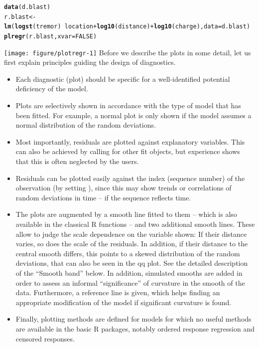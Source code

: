 \documentclass[11pt]{article}\usepackage[]{graphicx}\usepackage[]{color}
\makeatletter
\newcommand{\hlnum}[1]{\textcolor[rgb]{0.686,0.059,0.569}{#1}}%
\newcommand{\hlopt}[1]{\textcolor[rgb]{0,0,0}{#1}}%
\newcommand{\hlstd}[1]{\textcolor[rgb]{0.345,0.345,0.345}{#1}}%
\newcommand{\hlkwb}[1]{\textcolor[rgb]{0.69,0.353,0.396}{#1}}%
\newcommand{\hlkwc}[1]{\textcolor[rgb]{0.333,0.667,0.333}{#1}}%
\newcommand{\hlkwd}[1]{\textcolor[rgb]{0.737,0.353,0.396}{\textbf{#1}}}%
\newenvironment{kframe}{%
 \def\at@end@of@kframe{}%
 \ifinner\ifhmode%
  \def\at@end@of@kframe{\end{minipage}}%
  \begin{minipage}{\columnwidth}%
 \fi\fi%
 \def\FrameCommand##1{\hskip\@totalleftmargin \hskip-\fboxsep
 \colorbox{shadecolor}{##1}\hskip-\fboxsep
     \hskip-\linewidth \hskip-\@totalleftmargin \hskip\columnwidth}%
 \MakeFramed {\advance\hsize-\width
   \@totalleftmargin\z@ \linewidth\hsize
   \@setminipage}}%
 {\par\unskip\endMakeFramed%
 \at@end@of@kframe}
\newenvironment{knitrout}{}{} %
\makeatother
\begin{document}
\begin{knitrout}
\color{fgcolor}\begin{kframe}
\begin{alltt}
\hlkwd{data}\hlstd{(d.blast)}
\hlstd{r.blast} \hlkwb{<-}
  \hlkwd{lm}\hlstd{(}\hlkwd{logst}\hlstd{(tremor)}\hlopt{~}\hlstd{location}\hlopt{+}\hlkwd{log10}\hlstd{(distance)}\hlopt{+}\hlkwd{log10}\hlstd{(charge),} \hlkwc{data}\hlstd{=d.blast)}
\hlkwd{plregr}\hlstd{(r.blast,} \hlkwc{xvar}\hlstd{=}\hlnum{FALSE}\hlstd{)}
\end{alltt}
\end{kframe}
\texttt{[image: figure/plotregr-1]} 
\end{knitrout}
Before we describe the plots in some detail, let us first explain  
principles guiding the design of diagnostics.
\begin{itemize}
\item
Each diagnostic (plot) should be specific for a well-identified potential 
deficiency of the model.
\item
Plots are selectively shown in accordance with the type of model that has 
been fitted. For example, a normal plot is only shown if the model assumes
a normal distribution of the random deviations.
\item
Most importantly, residuals are plotted against explanatory variables.
This can also be achieved by calling  for other fit objects,  
but experience shows that this is often neglected by the users.
\item
Residuals can be plotted easily against the index (sequence number) 
of the observation (by setting ), 
since this may show trends or correlations of random deviations in time --
if the sequence reflects time.
\item
The plots are augmented by a smooth line fitted to them -- which is also
available in the classical R functions -- and two additional smooth lines.
These allow to judge the scale dependence on the variable shown:
If their distance varies, so does the scale of the residuals.
In addition, if their distance to the central smooth differs, this 
points to a skewed distribution of the random deviations, 
that can also be seen in the qq plot. See the detailed description 
of the ``Smooth band'' below. 
In addition, simulated smooths are added in order to assess an informal 
``significance'' of curvature in the smooth of the data. 
Furthermore, a reference line is given, which helps finding
an appropriate modification of the model if significant curvature is
found. 
\item
Finally, plotting methods are defined for models for which no useful 
methods are available in the basic R packages, notably ordered response
regression and censored responses.
\end{itemize}
\end{document}
